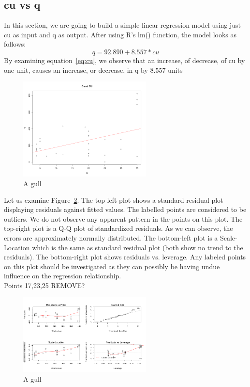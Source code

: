 \documentclass[a4paper,12pt, english]{article}
\begin{document}
\subsection{cu vs q} 
In this section, we are going to build a simple linear regression model using just cu as input and q as output. After using R's lm() function, the model looks as follows:\\
\begin{equation}
\label{eq:cu}
q = 92.890    +    8.557*cu 
\end{equation}       
By examining equation~\ref{eq:cu}, we observe that an increase, of decrease, of cu by one unit, causes an increase, or decrease, in q by 8.557 units
\begin{figure}[h!]
  \centering
  \includegraphics[width=0.6\textwidth]{cu-line}
  \caption{A gull}
  \label{fig:cu-line}
\end{figure}

Let us examine Figure~\ref{fig:cu-goodness}. The top-left plot shows a standard residual plot displaying residuals against fitted values. The labelled points are considered to be outliers. We do not observe any apparent pattern in the points on this plot. The top-right plot is a Q-Q plot of standardized residuals. As we can observe, the errors are approximately normally distributed. The bottom-left plot is a Scale-Location which is the same as standard residual plot (both show no trend to the residuals). The bottom-right plot shows residuals vs. leverage. Any labeled points on this plot should be investigated as they can possibly be having undue influence on the regression relationship.\\
Points 17,23,25 REMOVE?


\begin{figure}[!htbp]
  \centering
  \includegraphics[width=0.6\textwidth]{cu-goodness}
  \caption{A gull}
  \label{fig:cu-goodness}
\end{figure}
\end{document}
